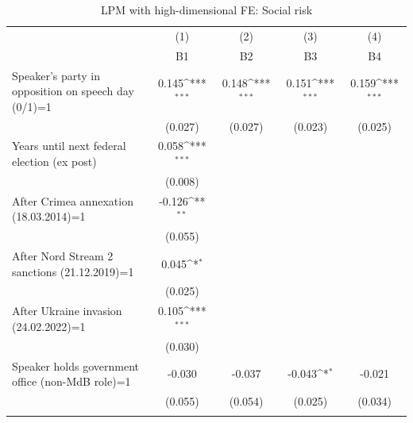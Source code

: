 \begin{table}[htbp]\centering
\def\sym#1{\ifmmode^{#1}\else\(^{#1}\)\fi}
\caption{LPM with high-dimensional FE: Social risk}
\begin{tabular}{l*{4}{c}}
\toprule
                    &\multicolumn{1}{c}{(1)}&\multicolumn{1}{c}{(2)}&\multicolumn{1}{c}{(3)}&\multicolumn{1}{c}{(4)}\\
                    &\multicolumn{1}{c}{B1}&\multicolumn{1}{c}{B2}&\multicolumn{1}{c}{B3}&\multicolumn{1}{c}{B4}\\
\midrule
Speaker's party in opposition on speech day (0/1)=1&       0.145\sym{***}&       0.148\sym{***}&       0.151\sym{***}&       0.159\sym{***}\\
                    &     (0.027)         &     (0.027)         &     (0.023)         &     (0.025)         \\
\addlinespace
Years until next federal election (ex post)&       0.058\sym{***}&                     &                     &                     \\
                    &     (0.008)         &                     &                     &                     \\
\addlinespace
After Crimea annexation (18.03.2014)=1&      -0.126\sym{**} &                     &                     &                     \\
                    &     (0.055)         &                     &                     &                     \\
\addlinespace
After Nord Stream 2 sanctions (21.12.2019)=1&       0.045\sym{*}  &                     &                     &                     \\
                    &     (0.025)         &                     &                     &                     \\
\addlinespace
After Ukraine invasion (24.02.2022)=1&       0.105\sym{***}&                     &                     &                     \\
                    &     (0.030)         &                     &                     &                     \\
\addlinespace
Speaker holds government office (non-MdB role)=1&      -0.030         &      -0.037         &      -0.043\sym{*}  &      -0.021         \\
                    &     (0.055)         &     (0.054)         &     (0.025)         &     (0.034)         \\
\addlinespace

\end{tabular}
\end{table}
